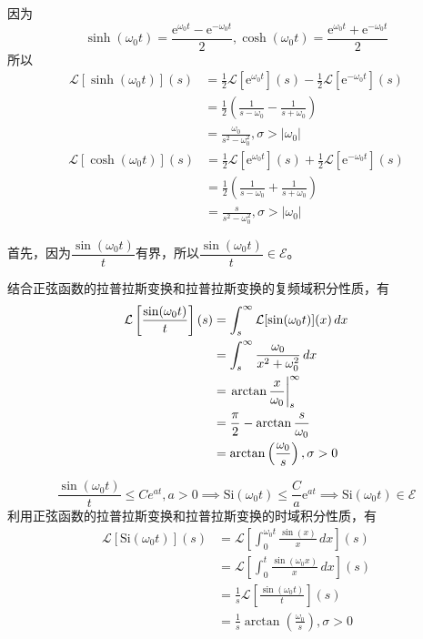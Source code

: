 \begin{example}[双曲函数]
    因为
    \[\sinh(\omega_0 t)=\frac{\mathrm{e}^{\omega_0 t}-\mathrm{e}^{-\omega_0 t}}{2},\cosh(\omega_0 t)=\frac{\mathrm{e}^{\omega_0 t}+\mathrm{e}^{-\omega_0 t}}{2}\]
    所以
    \begin{align*}
        \mathcal{L} \left[\sinh(\omega_0 t)\right](s)&=\frac{1}{2}\mathcal{L} \left[\mathrm{e}^{\omega_0 t}\right](s)-\frac{1}{2}\mathcal{L} \left[\mathrm{e}^{-\omega_0 t}\right](s)\\
        &=\frac{1}{2}\left(\frac{1}{s-\omega_0}-\frac{1}{s+\omega_0}\right)\\
        &=\frac{\omega_0}{s^2-\omega_0^2},\sigma>|\omega_0|
    \end{align*}
    \begin{align*}
        \mathcal{L} \left[\cosh(\omega_0 t)\right](s)&=\frac{1}{2}\mathcal{L} \left[\mathrm{e}^{\omega_0 t}\right](s)+\frac{1}{2}\mathcal{L} \left[\mathrm{e}^{-\omega_0 t}\right](s)\\
        &=\frac{1}{2}\left(\frac{1}{s-\omega_0}+\frac{1}{s+\omega_0}\right)\\
        &=\frac{s}{s^2-\omega_0^2},\sigma>|\omega_0|
    \end{align*}
\end{example}

\begin{example}[采样函数]
    首先，因为$\dfrac{\sin(\omega_0 t)}{t}$有界，所以$\dfrac{\sin(\omega_0 t)}{t}\in\mathcal{E}$。

    结合正弦函数的拉普拉斯变换和拉普拉斯变换的复频域积分性质，有
    \begin{align*}
        \mathcal{L} \left[\frac{\sin(\omega_0 t)}{t}\right](s)&=\int_s^{\infty}\mathcal{L}[\sin(\omega_0 t)](x)\,dx\\
        &=\int_s^{\infty}\frac{\omega_0}{x^2+\omega_0^2}\,dx\\
        &=\left.\arctan\frac{x}{\omega_0}\right|_{s}^{\infty}\\
        &=\frac{\pi}{2}-\arctan\frac{s}{\omega_0}\\
        &=\arctan\left(\frac{\omega_0}{s}\right),\sigma>0
    \end{align*}
\end{example}

\begin{example}[正弦积分函数]
    $$\frac{\sin(\omega_0 t)}{t}\leq Ce^{a t},a>0\implies \text{Si}(\omega_0 t)\leq \frac{C}{a}\mathrm{e}^{a t}\implies \text{Si}(\omega_0 t)\in\mathcal{E}$$
    利用正弦函数的拉普拉斯变换和拉普拉斯变换的时域积分性质，有
    \begin{align*}
        \mathcal{L} [\text{Si}(\omega_0 t)](s)&=\mathcal{L} \left[\int_0^{\omega_0 t} \frac{\sin(x)}{x}\,dx\right](s)\\
        &=\mathcal{L} \left[\int_0^{t} \frac{\sin(\omega_0 x)}{x}\,dx\right](s)\\
        &=\frac{1}{s}\mathcal{L} \left[\frac{\sin(\omega_0 t)}{t}\right](s)\\
        &=\frac{1}{s}\arctan\left(\frac{\omega_0}{s}\right),\sigma>0
    \end{align*}    
\end{example}

